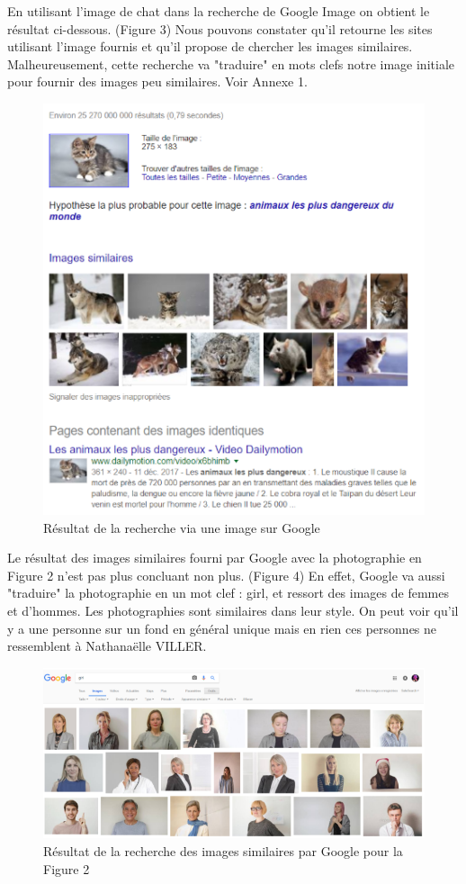 \documentclass[a4paper,12pt]{article}
\begin{document}
En utilisant l'image de chat dans la recherche de Google Image on obtient le résultat ci-dessous. (Figure 3) Nous pouvons constater qu'il retourne les sites utilisant l'image fournis et qu'il propose de chercher les images similaires.  Malheureusement, cette recherche va "traduire" en mots clefs notre image initiale pour fournir des images peu similaires. Voir Annexe 1.

    \begin{figure}[!ht]
    \centering
        \includegraphics[scale=1]{images/ResGI.PNG}
        \caption{Résultat de la recherche via une image sur Google}
    \end{figure}

Le résultat des images similaires fourni par Google avec la photographie en Figure 2 n'est pas plus concluant non plus. (Figure 4) En effet, Google va aussi "traduire" la photographie en un mot clef : girl, et ressort des images de femmes et d'hommes. Les photographies sont similaires dans leur style. On peut voir qu'il y a une personne sur un fond en général unique mais en rien ces personnes ne ressemblent à Nathanaëlle VILLER.
    \begin{figure}[!ht]
    \centering
        \includegraphics[scale=0.7]{images/Res3GI.PNG}
        \caption{Résultat de la recherche des images similaires par Google pour la Figure 2}
    \end{figure}
    
\end{document}

